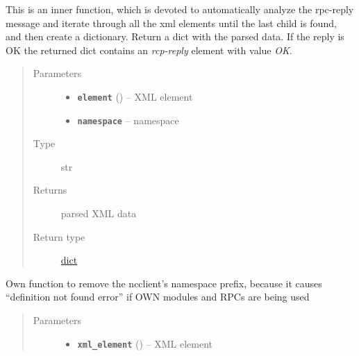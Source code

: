 \documentclass[letterpaper,10pt,english]{sphinxmanual}
\begin{document}
\begin{fulllineitems}
\begin{fulllineitems}
\label{util/netconf:escape.util.netconf.AbstractNETCONFAdapter._AbstractNETCONFAdapter__parse_xml_response}
This is an inner function, which is devoted to automatically analyze the
rpc-reply message and iterate through all the xml elements until the last
child is found, and then create a dictionary. Return a dict with the
parsed data. If the reply is OK the returned dict contains an \emph{rcp-reply}
element with value \emph{OK}.
\begin{quote}\begin{description}
\item[{Parameters}] \leavevmode\begin{itemize}
\item {} 
\textbf{\texttt{element}} () -- XML element

\item {} 
\textbf{\texttt{namespace}} -- namespace

\end{itemize}

\item[{Type}] \leavevmode
str

\item[{Returns}] \leavevmode
parsed XML data

\item[{Return type}] \leavevmode
\href{https://docs.python.org/2.7/library/stdtypes.html\#dict}{dict}

\end{description}\end{quote}

\end{fulllineitems}


\begin{fulllineitems}
\label{util/netconf:escape.util.netconf.AbstractNETCONFAdapter._AbstractNETCONFAdapter__remove_namespace}
Own function to remove the ncclient's namespace prefix, because it causes
``definition not found error'' if OWN modules and RPCs are being used
\begin{quote}\begin{description}
\item[{Parameters}] \leavevmode\begin{itemize}
\item {} 
\textbf{\texttt{xml\_element}} () -- XML element


\end{itemize}
\end{description}
\end{quote}
\end{fulllineitems}
\end{fulllineitems}
\end{document}
